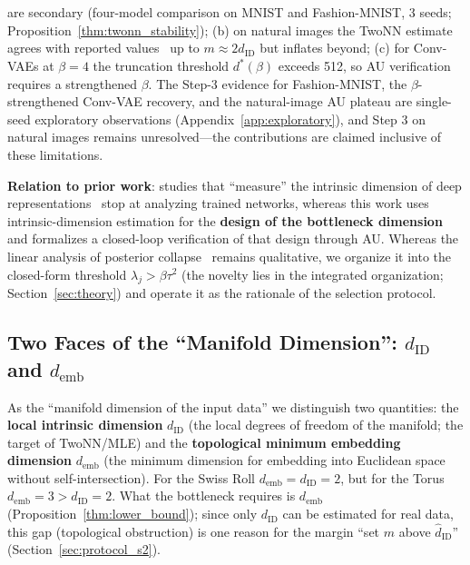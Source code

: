 \documentclass[make,article,submit,pdftex,moreauthors]{Definitions/mdpi}
\newcommand{\dID}{d_{\mathrm{ID}}}
\newcommand{\hatdID}{\hat{d}_{\mathrm{ID}}}
\newcommand{\demb}{d_{\mathrm{emb}}}
\newcommand{\dstar}{d^{*}(\beta)}
\begin{document}
\begin{enumerate}
        are secondary (four-model comparison on MNIST and Fashion-MNIST,
        3 seeds; Proposition~\ref{thm:twonn_stability});
        (b) on natural images the TwoNN estimate agrees with reported
        values~\cite{pope2021intrinsic} up to $m \approx 2\hatdID$ but
        inflates beyond;
        (c) for Conv-VAEs at $\beta = 4$ the truncation threshold $\dstar$
        exceeds 512, so AU verification requires a strengthened $\beta$.
        The Step-3 evidence for Fashion-MNIST, the $\beta$-strengthened
        Conv-VAE recovery, and the natural-image AU plateau are single-seed
        exploratory observations (Appendix~\ref{app:exploratory}), and
        Step 3 on natural images remains unresolved---the contributions are
        claimed inclusive of these limitations.
\end{enumerate}

\textbf{Relation to prior work}:
studies that ``measure'' the intrinsic dimension of deep
representations~\cite{ansuini2019intrinsic,pope2021intrinsic,valeriani2023geometry}
stop at analyzing trained networks, whereas this work uses
intrinsic-dimension estimation for the \textbf{design of the bottleneck
dimension} and formalizes a closed-loop verification of that design through
AU.
Whereas the linear analysis of posterior collapse~\cite{lucas2019elbo}
remains qualitative, we organize it into the closed-form threshold
$\lambda_j > \beta\tau^2$ (the novelty lies in the integrated organization;
Section~\ref{sec:theory}) and operate it as the rationale of the selection
protocol.

\subsection{Two Faces of the ``Manifold Dimension'': $\dID$ and $\demb$}\label{sec:intro_dim}

As the ``manifold dimension of the input data'' we distinguish two
quantities:
the \textbf{local intrinsic dimension} $\dID$ (the local degrees of freedom
of the manifold; the target of TwoNN/MLE) and the
\textbf{topological minimum embedding dimension} $\demb$ (the minimum
dimension for embedding into Euclidean space without self-intersection).
For the Swiss Roll $\demb = \dID = 2$, but for the Torus
$\demb = 3 > \dID = 2$.
What the bottleneck requires is $\demb$
(Proposition~\ref{thm:lower_bound}); since only $\dID$ can be estimated for
real data, this gap (topological obstruction) is one reason for the margin
``set $m$ above $\hatdID$'' (Section~\ref{sec:protocol_s2}).
\end{document}
